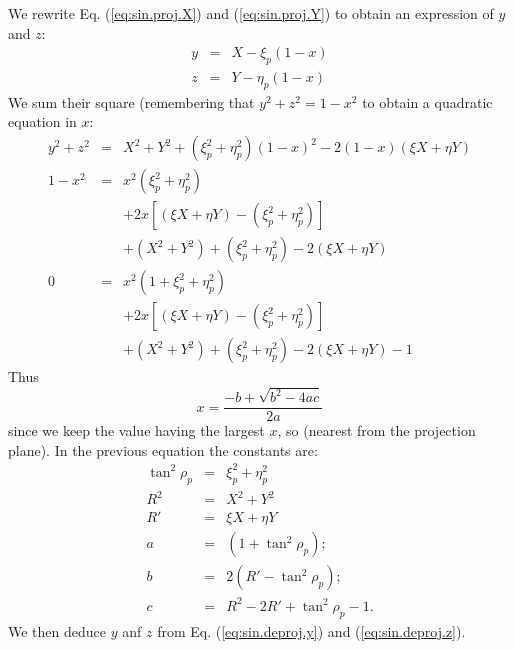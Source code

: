     We rewrite Eq. (\ref{eq:sin.proj.X}) and (\ref{eq:sin.proj.Y}) to obtain an expression of $y$ and $z$:
    \begin{eqnarray}
      y & = & X -  \xi_p (1-x) \label{eq:sin.deproj.y}\\
      z & = & Y - \eta_p (1-x) \label{eq:sin.deproj.z}
    \end{eqnarray}
    We sum their square (remembering that $y^2+z^2 = 1 - x^2$ to obtain a quadratic equation in $x$:
    \begin{eqnarray}
      y^2+z^2 & = & X^2 + Y^2 + (\xi_p^2 + \eta_p^2)(1-x)^2 - 2(1-x)(\xi X + \eta Y) \\
      1 - x^2 & = & x^2(\xi_p^2 + \eta_p^2) \nonumber \\
              &   & + 2x[(\xi X + \eta Y) - (\xi_p^2 + \eta_p^2)] \nonumber \\
              &   & + (X^2 + Y^2) + (\xi_p^2 + \eta_p^2) - 2(\xi X + \eta Y) \\
	    0 & = & x^2(1 + \xi_p^2 + \eta_p^2) \nonumber \\
	      &   & + 2x[(\xi X + \eta Y) - (\xi_p^2 + \eta_p^2)] \nonumber \\
	      &   & + (X^2 + Y^2) + (\xi_p^2 + \eta_p^2) - 2(\xi X + \eta Y)  - 1
    \end{eqnarray}
    Thus
    \begin{equation}
      x = \frac{-b+\sqrt{b^2-4ac}}{2a} \label{eq:sin.deproj.x}
    \end{equation}
    since we keep the value having the largest $x$, so (nearest from the projection plane).
    In the previous equation the constants are:
    \begin{eqnarray}
      \tan^2\rho_p & = & \xi_p^2 + \eta_p^2 \\
      R^2 & = & X^2 + Y^2 \\
      R' & = & \xi X + \eta Y \\
      a & = & (1 + \tan^2\rho_p);  \\
      b & = & 2(R' -  \tan^2\rho_p); \\
      c & = & R^2 - 2R' + \tan^2\rho_p - 1.
    \end{eqnarray}
    We then deduce $y$ anf $z$ from Eq. (\ref{eq:sin.deproj.y}) and (\ref{eq:sin.deproj.z}).

